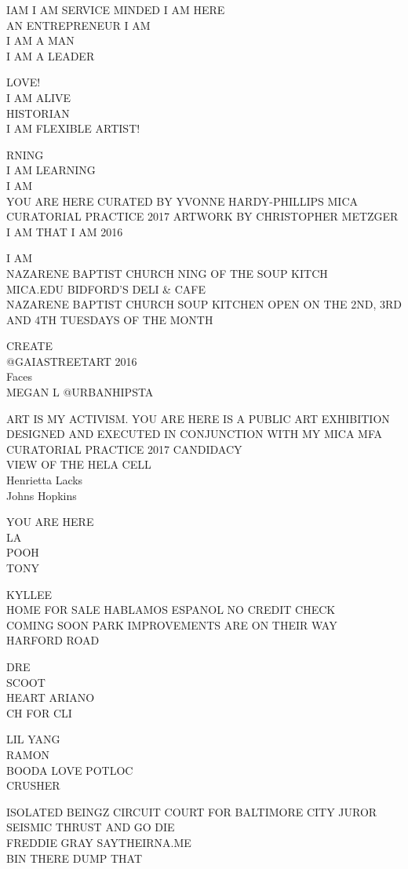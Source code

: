 \documentclass[10pt,letterpaper]{article}
\begin{document}
IAM I AM SERVICE MINDED I AM HERE\\
AN ENTREPRENEUR I AM\\
I AM A MAN\\
I AM A LEADER

LOVE!\\
I AM ALIVE\\
HISTORIAN\\
I AM FLEXIBLE ARTIST!

RNING\\
I AM LEARNING\\
I AM\\
YOU ARE HERE CURATED BY YVONNE HARDY{-}PHILLIPS MICA CURATORIAL PRACTICE 2017 ARTWORK BY CHRISTOPHER METZGER I AM THAT I AM 2016

I AM\\
NAZARENE BAPTIST CHURCH NING OF THE SOUP KITCH\\
MICA.EDU BIDFORD'S DELI \& CAFE\\
NAZARENE BAPTIST CHURCH SOUP KITCHEN OPEN ON THE 2ND, 3RD AND 4TH TUESDAYS OF THE MONTH

CREATE\\
@GAIASTREETART 2016\\
Faces\\
MEGAN L @URBANHIPSTA

ART IS MY ACTIVISM.  YOU ARE HERE IS A PUBLIC ART EXHIBITION DESIGNED AND EXECUTED IN CONJUNCTION WITH MY MICA MFA CURATORIAL PRACTICE 2017 CANDIDACY\\
VIEW OF THE HELA CELL\\
Henrietta Lacks\\
Johns Hopkins

YOU ARE HERE\\
LA\\
POOH\\
TONY

KYLLEE\\
HOME FOR SALE HABLAMOS ESPANOL NO CREDIT CHECK\\
COMING SOON PARK IMPROVEMENTS ARE ON THEIR WAY\\
HARFORD ROAD

DRE\\
SCOOT\\
HEART ARIANO\\
CH FOR CLI

LIL YANG\\
RAMON\\
BOODA LOVE POTLOC\\
CRUSHER

ISOLATED BEINGZ CIRCUIT COURT FOR BALTIMORE CITY JUROR\\
SEISMIC THRUST AND GO DIE\\
FREDDIE GRAY SAYTHEIRNA.ME\\
BIN THERE DUMP THAT
\end{document}
